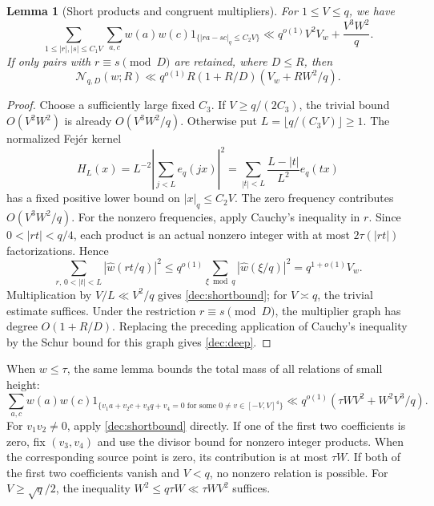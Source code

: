 \documentclass[11pt,a4paper]{article}
\theoremstyle{paperplain}
\newtheorem{lemma}[theorem]{Lemma}
\numberwithin{equation}{section}
\begin{document}
\begin{lemma}[Short products and congruent multipliers]\label{dec:fejer}
For $1\le V\le q$, we have
\begin{equation}\label{dec:shortbound}
 \sum_{1\le|r|,|s|\le C_1V}\sum_{a,c}w(a)w(c)
 1_{\{|ra-sc|_q\le C_2V\}}
 \ll q^{o(1)}V^2V_w+\frac{V^3W^2}{q}.
\end{equation}
If only pairs with $r\equiv s\pmod D$ are retained, where $D\le R$, then
\begin{equation}\label{dec:deep}
 \mathcal N_{q,D}(w;R)
 \ll q^{o(1)}R(1+R/D)(V_w+RW^2/q).
\end{equation}
\end{lemma}
\begin{proof}
Choose a sufficiently large fixed $C_3$.
If $V\ge q/(2C_3)$, the trivial bound $O(V^2W^2)$ is already
$O(V^3W^2/q)$. Otherwise put $L=\lfloor q/(C_3V)\rfloor\ge1$.
The normalized Fej\'er kernel
\[
 H_L(x)=L^{-2}\left|\sum_{j<L}e_q(jx)\right|^2
 =\sum_{|t|<L}\frac{L-|t|}{L^2}e_q(tx)
\]
has a fixed positive lower bound on $|x|_q\le C_2V$.
The zero frequency contributes $O(V^3W^2/q)$.
For the nonzero frequencies, apply Cauchy's inequality in $r$.
Since $0<|rt|<q/4$, each product is an actual nonzero integer with at most
$2\tau(|rt|)$ factorizations. Hence
\[
 \sum_{r,\,0<|t|<L}|\widehat w(rt/q)|^2
 \le q^{o(1)}\sum_{\xi\bmod q}|\widehat w(\xi/q)|^2=q^{1+o(1)}V_w.
\]
Multiplication by $V/L\ll V^2/q$ gives \eqref{dec:shortbound};
for $V\asymp q$, the trivial estimate suffices.
Under the restriction $r\equiv s\pmod D$, the multiplier graph has degree
$O(1+R/D)$. Replacing the preceding application of Cauchy's inequality
by the Schur bound for this graph gives \eqref{dec:deep}.
\end{proof}

When $w\le\tau$, the same lemma bounds the total mass of all
relations of small height:
\begin{equation}\label{dec:relation}
 \sum_{a,c}w(a)w(c)
 1_{\{v_1a+v_2c+v_3q+v_4=0\text{ for some }0\ne v\in[-V,V]^4\}}
 \ll q^{o(1)}(\tau WV^2+W^2V^3/q).
\end{equation}
For $v_1v_2\ne0$, apply \eqref{dec:shortbound} directly.
If one of the first two coefficients is zero, fix $(v_3,v_4)$ and use
the divisor bound for nonzero integer products. When the corresponding
source point is zero, its contribution is at most $\tau W$.
If both of the first two coefficients vanish and $V<q$, no nonzero
relation is possible. For $V\ge\sqrt q/2$, the inequality
$W^2\le q\tau W\ll\tau WV^2$ suffices.
\end{document}

